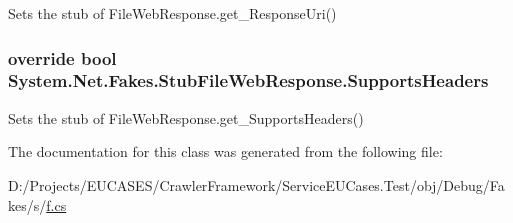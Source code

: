 Sets the stub of File\-Web\-Response.\-get\-\_\-\-Response\-Uri()

\hypertarget{class_system_1_1_net_1_1_fakes_1_1_stub_file_web_response_a7ab5cbe967179caa5b4b59943fafc03c}{
\subsubsection[{Supports\-Headers}]{\setlength{\rightskip}{0pt plus 5cm}override bool System.\-Net.\-Fakes.\-Stub\-File\-Web\-Response.\-Supports\-Headers\hspace{0.3cm}{\ttfamily [get]}}}\label{class_system_1_1_net_1_1_fakes_1_1_stub_file_web_response_a7ab5cbe967179caa5b4b59943fafc03c}


Sets the stub of File\-Web\-Response.\-get\-\_\-\-Supports\-Headers()



The documentation for this class was generated from the following file\-:\begin{DoxyCompactItemize}
\item 
D\-:/\-Projects/\-E\-U\-C\-A\-S\-E\-S/\-Crawler\-Framework/\-Service\-E\-U\-Cases.\-Test/obj/\-Debug/\-Fakes/s/\hyperlink{s_2f_8cs}{f.\-cs}\end{DoxyCompactItemize}
